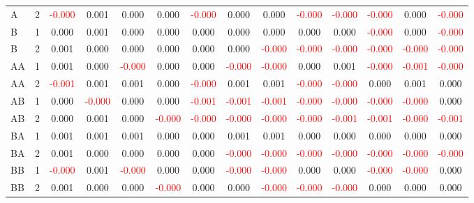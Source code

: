 \begin{table}[!htb]
{\begin{tabular}{llcccccccccccc}
A & 2 & \textcolor{red}{-0.000} & 0.001 & 0.000 & 0.000 & \textcolor{red}{-0.000} & 0.000 & 0.000 & \textcolor{red}{-0.000} & \textcolor{red}{-0.000} & \textcolor{red}{-0.000} & 0.000 & \textcolor{red}{-0.000}\\
B & 1 & 0.000 & 0.001 & 0.000 & 0.000 & 0.000 & 0.000 & 0.000 & 0.000 & 0.000 & \textcolor{red}{-0.000} & 0.000 & \textcolor{red}{-0.000}\\
B & 2 & 0.001 & 0.000 & 0.000 & 0.000 & 0.000 & 0.000 & \textcolor{red}{-0.000} & \textcolor{red}{-0.000} & \textcolor{red}{-0.000} & \textcolor{red}{-0.000} & \textcolor{red}{-0.000} & \textcolor{red}{-0.000}\\
AA & 1 & 0.001 & 0.000 & \textcolor{red}{-0.000} & 0.000 & 0.000 & \textcolor{red}{-0.000} & \textcolor{red}{-0.000} & 0.000 & 0.001 & \textcolor{red}{-0.000} & \textcolor{red}{-0.001} & \textcolor{red}{-0.000}\\
AA & 2 & \textcolor{red}{-0.001} & 0.001 & 0.001 & 0.000 & \textcolor{red}{-0.000} & 0.001 & 0.001 & \textcolor{red}{-0.000} & \textcolor{red}{-0.000} & 0.000 & 0.001 & 0.000\\
AB & 1 & 0.000 & \textcolor{red}{-0.000} & 0.000 & 0.000 & \textcolor{red}{-0.001} & \textcolor{red}{-0.001} & \textcolor{red}{-0.001} & \textcolor{red}{-0.000} & \textcolor{red}{-0.000} & \textcolor{red}{-0.000} & \textcolor{red}{-0.000} & 0.000\\
AB & 2 & 0.000 & 0.001 & 0.000 & \textcolor{red}{-0.000} & \textcolor{red}{-0.000} & \textcolor{red}{-0.000} & \textcolor{red}{-0.000} & \textcolor{red}{-0.000} & \textcolor{red}{-0.001} & \textcolor{red}{-0.001} & \textcolor{red}{-0.000} & \textcolor{red}{-0.001}\\
BA & 1 & 0.001 & 0.001 & 0.001 & 0.000 & 0.000 & 0.001 & 0.001 & 0.000 & 0.000 & 0.000 & 0.000 & 0.000\\
BA & 2 & 0.001 & 0.000 & 0.000 & 0.000 & 0.000 & \textcolor{red}{-0.000} & \textcolor{red}{-0.000} & \textcolor{red}{-0.000} & \textcolor{red}{-0.000} & \textcolor{red}{-0.000} & \textcolor{red}{-0.000} & \textcolor{red}{-0.000}\\
BB & 1 & \textcolor{red}{-0.000} & 0.001 & \textcolor{red}{-0.000} & 0.000 & 0.000 & \textcolor{red}{-0.000} & \textcolor{red}{-0.000} & 0.000 & 0.000 & \textcolor{red}{-0.000} & \textcolor{red}{-0.000} & 0.000\\
BB & 2 & 0.001 & 0.000 & 0.000 & \textcolor{red}{-0.000} & 0.000 & 0.000 & \textcolor{red}{-0.000} & \textcolor{red}{-0.000} & \textcolor{red}{-0.000} & 0.000 & 0.000 & 0.000\\

\end{tabular}}
\end{table}
